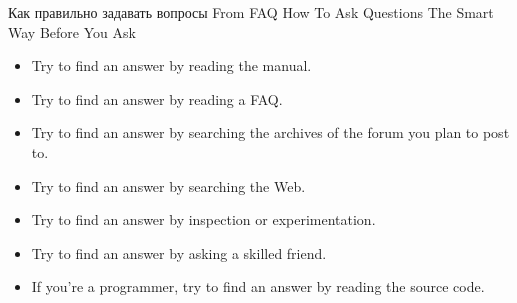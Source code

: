\begin{frame}[fragile]{Как правильно задавать вопросы}
From FAQ How To Ask Questions The Smart Way
Before You Ask
  \begin{itemize}
	  \item Try to find an answer by reading the manual.
	  \item Try to find an answer by reading a FAQ.
	  \item Try to find an answer by searching the archives of the forum you plan to post to.
	  \item Try to find an answer by searching the Web.
	  \item Try to find an answer by inspection or experimentation.
	  \item Try to find an answer by asking a skilled friend.
	  \item If you're a programmer, try to find an answer by reading the source code.
    \end{itemize}
\end{frame}


